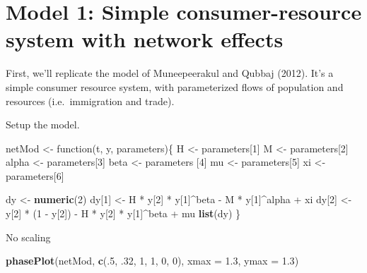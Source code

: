 \documentclass[]{article}
\newenvironment{Shaded}{\begin{snugshade}}{\end{snugshade}}
\newcommand{\KeywordTok}[1]{\textcolor[rgb]{0.13,0.29,0.53}{\textbf{{#1}}}}
\newcommand{\DataTypeTok}[1]{\textcolor[rgb]{0.13,0.29,0.53}{{#1}}}
\newcommand{\DecValTok}[1]{\textcolor[rgb]{0.00,0.00,0.81}{{#1}}}
\newcommand{\FloatTok}[1]{\textcolor[rgb]{0.00,0.00,0.81}{{#1}}}
\newcommand{\StringTok}[1]{\textcolor[rgb]{0.31,0.60,0.02}{{#1}}}
\newcommand{\NormalTok}[1]{{#1}}
\begin{document}
\section{Model 1: Simple consumer-resource system with network
effects}\label{model-1-simple-consumer-resource-system-with-network-effects}

First, we'll replicate the model of Muneepeerakul and Qubbaj (2012).
It's a simple consumer resource system, with parameterized flows of
population and resources (i.e.~immigration and trade).

Setup the model.

\begin{Shaded}
\begin{Highlighting}[]
\NormalTok{netMod <-}\StringTok{ }\NormalTok{function(t, y, parameters)\{}
    \NormalTok{H <-}\StringTok{ }\NormalTok{parameters[}\DecValTok{1}\NormalTok{]}
    \NormalTok{M <-}\StringTok{ }\NormalTok{parameters[}\DecValTok{2}\NormalTok{]}
    \NormalTok{alpha <-}\StringTok{ }\NormalTok{parameters[}\DecValTok{3}\NormalTok{]}
    \NormalTok{beta <-}\StringTok{ }\NormalTok{parameters [}\DecValTok{4}\NormalTok{]}
    \NormalTok{mu <-}\StringTok{ }\NormalTok{parameters[}\DecValTok{5}\NormalTok{]}
    \NormalTok{xi <-}\StringTok{ }\NormalTok{parameters[}\DecValTok{6}\NormalTok{]}
    
    \NormalTok{dy <-}\StringTok{ }\KeywordTok{numeric}\NormalTok{(}\DecValTok{2}\NormalTok{)}
    \NormalTok{dy[}\DecValTok{1}\NormalTok{] <-}\StringTok{ }\NormalTok{H *}\StringTok{ }\NormalTok{y[}\DecValTok{2}\NormalTok{] *}\StringTok{ }\NormalTok{y[}\DecValTok{1}\NormalTok{]^beta -}\StringTok{ }\NormalTok{M *}\StringTok{ }\NormalTok{y[}\DecValTok{1}\NormalTok{]^alpha +}\StringTok{ }\NormalTok{xi}
    \NormalTok{dy[}\DecValTok{2}\NormalTok{] <-}\StringTok{ }\NormalTok{y[}\DecValTok{2}\NormalTok{] *}\StringTok{ }\NormalTok{(}\DecValTok{1} \NormalTok{-}\StringTok{ }\NormalTok{y[}\DecValTok{2}\NormalTok{]) -}\StringTok{ }\NormalTok{H *}\StringTok{ }\NormalTok{y[}\DecValTok{2}\NormalTok{] *}\StringTok{ }\NormalTok{y[}\DecValTok{1}\NormalTok{]^beta +}\StringTok{ }\NormalTok{mu}
    \KeywordTok{list}\NormalTok{(dy)}
\NormalTok{\} }
\end{Highlighting}
\end{Shaded}

No scaling

\begin{Shaded}
\begin{Highlighting}[]
\KeywordTok{phasePlot}\NormalTok{(netMod, }\KeywordTok{c}\NormalTok{(.}\DecValTok{5}\NormalTok{, .}\DecValTok{32}\NormalTok{, }\DecValTok{1}\NormalTok{, }\DecValTok{1}\NormalTok{, }\DecValTok{0}\NormalTok{, }\DecValTok{0}\NormalTok{), }\DataTypeTok{xmax =} \FloatTok{1.3}\NormalTok{, }\DataTypeTok{ymax =} \FloatTok{1.3}\NormalTok{)}
\end{Highlighting}
\end{Shaded}
\end{document}

